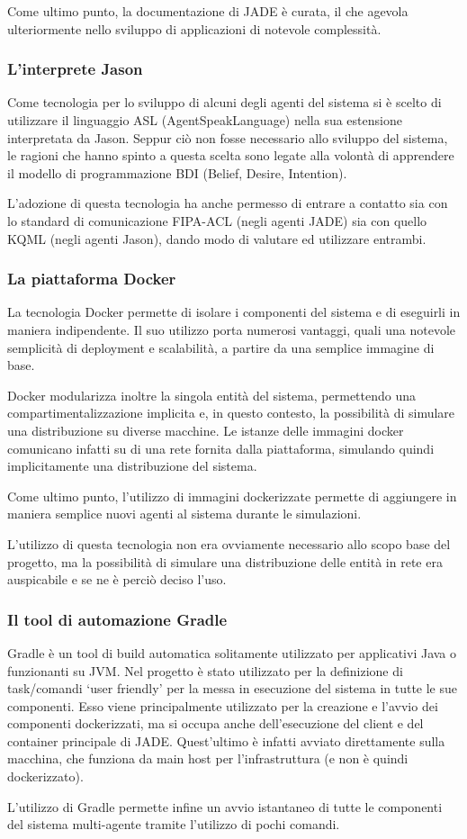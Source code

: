 Come ultimo punto, la documentazione di JADE è curata, il che agevola ulteriormente nello sviluppo di applicazioni di notevole complessità.

\subsubsection{L'interprete Jason}
Come tecnologia per lo sviluppo di alcuni degli agenti del sistema si è scelto di utilizzare il linguaggio ASL (AgentSpeakLanguage) nella sua estensione interpretata da Jason. Seppur ciò non fosse necessario allo sviluppo del sistema, le ragioni che hanno spinto a questa scelta sono legate alla volontà di apprendere il modello di programmazione BDI (Belief, Desire, Intention).

L'adozione di questa tecnologia ha anche permesso di entrare a contatto sia con lo standard di comunicazione FIPA-ACL\cite{ref:fipa-acl} (negli agenti JADE) sia con quello KQML\cite{ref:kqml} (negli agenti Jason), dando modo di valutare ed utilizzare entrambi.

\subsubsection{La piattaforma Docker}
La tecnologia Docker permette di isolare i componenti del sistema e di eseguirli in maniera indipendente. Il suo utilizzo porta numerosi vantaggi, quali una notevole semplicità di deployment e scalabilità, a partire da una semplice immagine di base.

Docker modularizza inoltre la singola entità del sistema, permettendo una compartimentalizzazione implicita e, in questo contesto, la possibilità di simulare una distribuzione su diverse macchine. Le istanze delle immagini docker comunicano infatti su di una rete fornita dalla piattaforma, simulando quindi implicitamente una distribuzione del sistema.

Come ultimo punto, l'utilizzo di immagini dockerizzate permette di aggiungere in maniera semplice nuovi agenti al sistema durante le simulazioni.

\parag
L'utilizzo di questa tecnologia non era ovviamente necessario allo scopo base del progetto, ma la possibilità di simulare una distribuzione delle entità in rete era auspicabile e se ne è perciò deciso l'uso.

\subsubsection{Il tool di automazione Gradle}
Gradle\cite{ref:gradle} è un tool di build automatica solitamente utilizzato per applicativi Java o funzionanti su JVM. Nel progetto è stato utilizzato per la definizione di task/comandi `user friendly' per la messa in esecuzione del sistema in tutte le sue componenti. Esso viene principalmente utilizzato per la creazione e l'avvio dei componenti dockerizzati, ma si occupa anche dell'esecuzione del client e del container principale di JADE. Quest'ultimo è infatti avviato direttamente sulla macchina, che funziona da main host per l'infrastruttura (e non è quindi dockerizzato).

L'utilizzo di Gradle permette infine un avvio istantaneo di tutte le componenti del sistema multi-agente tramite l'utilizzo di pochi comandi.
